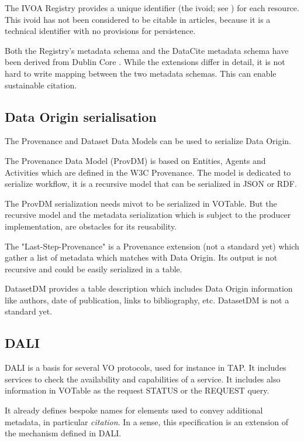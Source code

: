 \documentclass[11pt,a4paper]{ivoa}
\begin{document}
The IVOA Registry provides a unique identifier (the ivoid; see \citet{2016ivoa.spec.0523D}) for each resource.  This ivoid has not been considered to be citable in articles, because it is a technical identifier with no provisions for persistence.

Both the Registry's metadata schema and the DataCite
\citep{std:DataCite40} metadata schema have been
derived from Dublin Core \citep{std:DUBLINCORE}.  While the extensions differ in detail, it is not
hard to write mapping between the two metadata schemas.  This can enable
sustainable citation.

\subsection{Data Origin serialisation}
The Provenance \citep{2020ivoa.spec.0411S} and Dataset Data Models can be used to serialize Data Origin.

The Provenance Data Model (ProvDM) is based on Entities, Agents and Activities which are defined in the W3C Provenance. The model is dedicated to serialize workflow,
it is a recursive model that can be serialized in JSON or RDF.

The ProvDM serialization needs mivot to be serialized in VOTable. But the recursive model and the metadata serialization which is subject to the producer implementation, are obstacles for its reusability.


The "Last-Step-Provenance" is a Provenance extension (not a standard yet) which gather a list of metadata which matches with Data Origin. Its output is not recursive and could be easily serialized in a table.


DatasetDM provides a table description which includes Data Origin information like authors, date of publication, links to bibliography, etc.
DatasetDM is not a standard yet.

\subsection{DALI}
DALI \citep{2017ivoa.spec.0517D} is a basis for several VO protocols, used for instance in TAP. It includes services to  check the availability and capabilities of a service. It includes also information in VOTable as the request STATUS or the REQUEST query.

It already defines bespoke names for  elements used to convey additional metadata, in particular \emph{citation}.  In a sense, this specification is an extension of the mechanism defined in DALI.
\end{document}
